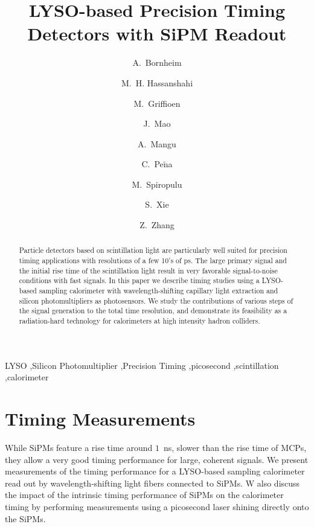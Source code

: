 \documentclass[preprint,1p]{elsarticle}
\begin{document}
  
\linenumbers

\begin{frontmatter}

\title{LYSO-based Precision Timing Detectors with SiPM Readout}

\author[1]{A.~Bornheim}
\author[2]{M.~H. Hassanshahi}
\author[1]{M.~Griffioen}
\author[1]{J.~Mao}
\author[1]{A.~Mangu}
\author[1]{C.~Pe$\tilde{\mathrm{n}}$a}
\author[1]{M.~Spiropulu}
\author[1]{S.~Xie }
\author[1]{Z.~Zhang}
\address[1]{California Institute of Technology, Pasadena, CA, USA}
\address[2]{Institute for Research in Fundamental Science, Tehran, Iran}


\begin{abstract}
Particle detectors based on scintillation light are particularly well suited for precision timing applications with 
resolutions of a few 10's of ps. The large primary signal and the initial rise time of the scintillation
light result in very favorable signal-to-noise conditions with fast signals. In this paper we describe timing 
studies using a LYSO-based sampling calorimeter with wavelength-shifting capillary light extraction and silicon
photomultipliers as photosensors. We study the contributions of various steps of the signal generation to 
the total time resolution, and demonstrate its feasibility as a radiation-hard technology for calorimeters
at high intensity hadron colliders.
\end{abstract}

\begin{keyword}
LYSO \sep Silicon Photomultiplier \sep Precision Timing \sep picosecond \sep scintillation \sep calorimeter
\end{keyword}

\end{frontmatter}

%
%

%
%
  
%
%
  
%
%

\section{Timing Measurements} 

While SiPMs feature a rise time around $1$~ns, slower than the rise time of MCPs, they
allow a very good timing performance for large, coherent signals. We present 
measurements of the timing performance for a
LYSO-based sampling calorimeter read out by wavelength-shifting light fibers
connected to SiPMs. W also discuss the impact of
the intrinsic timing performance of SiPMs on the calorimeter timing by performing measurements 
using a picosecond laser shining directly onto the SiPMs.
\end{document}
